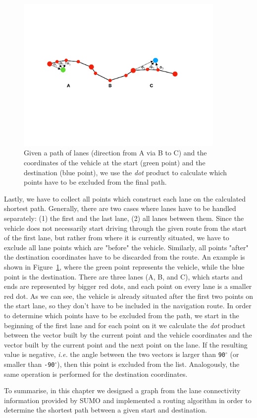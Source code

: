 \begin{figure}[htb]
	\centering
	\includegraphics[width=0.9\textwidth]{figures/navpoints}
	\caption{Given a path of lanes (direction from A via B to C) and the coordinates of the vehicle at the start (green point) and the destination (blue point), we use the \emph{dot} product to calculate which points have to be excluded from the final path.}
	\label{fig:navpoints}
\end{figure}

Lastly, we have to collect all points which construct each lane on the calculated shortest path. Generally, there are two cases where lanes have to be handled separately: (1) the first and the last lane, (2) all lanes between them. Since the vehicle does not necessarily start driving through the given route from the start of the first lane, but rather from where it is currently situated, we have to exclude all lane points which are "before" the vehicle. Similarly, all points "after" the destination coordinates have to be discarded from the route. An example is shown in Figure~\ref{fig:navpoints}, where the green point represents the vehicle, while the blue point is the destination. There are three lanes (A, B, and C), which starts and ends are represented by bigger red dots, and each point on every lane is a smaller red dot. As we can see, the vehicle is already situated after the first two points on the start lane, so they don't have to be included in the navigation route. In order to determine which points have to be excluded from the path, we start in the beginning of the first lane and for each point on it we calculate the \emph{dot} product between the vector built by the current point and the vehicle coordinates and the vector built by the current point and the next point on the lane. If the resulting value is negative, \emph{i.e.} the angle between the two vectors is larger than \texttt{90$^{\circ}$} (or smaller than \texttt{-90$^{\circ}$}), then this point is excluded from the list. Analogously, the same operation is performed for the destination coordinates.

To summarise, in this chapter we designed a graph from the lane connectivity information provided by SUMO and implemented a routing algorithm in order to determine the shortest path between a given start and destination. 
